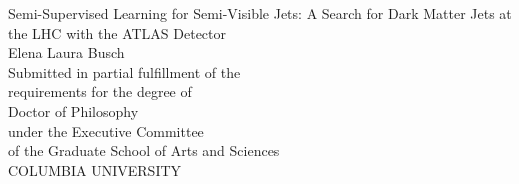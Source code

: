 
\begin{titlepage}
\begin{center}

\begin{singlespacing}
\vspace*{6\baselineskip}
Semi-Supervised Learning for Semi-Visible Jets: A Search for Dark Matter Jets at the LHC with the ATLAS Detector\\
\vspace{3\baselineskip}
Elena Laura Busch\\
\vspace{18\baselineskip}
Submitted in partial fulfillment of the\\
requirements for the degree of\\
Doctor of Philosophy\\
under the Executive Committee\\
of the Graduate School of Arts and Sciences\\
\vspace{3\baselineskip}
COLUMBIA UNIVERSITY\\
\vspace{3\baselineskip}
\the\year
\vfill


\end{singlespacing}

\end{center}
\end{titlepage}


